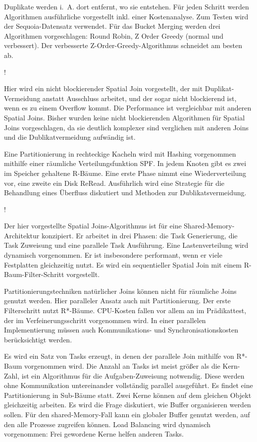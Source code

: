 \documentclass[a4paper,12pt,twoside]{article}
\begin{document}
	  Duplikate werden i.~A. dort entfernt, wo sie entstehen. Für jeden Schritt werden Algorithmen ausführliche vorgestellt inkl. einer Kostenanalyse. Zum Testen wird der Sequoia-Datensatz verwendet. Für das Bucket Merging  werden drei Algorithmen vorgeschlagen: Round Robin, Z Order Greedy (normal und verbessert). Der verbesserte Z-Order-Greedy-Algorithmus schneidet am besten ab. 

\textbf{}!

Hier wird ein nicht blockierender Spatial Join vorgestellt, der mit Duplikat-Vermeidung anstatt Ausschluss arbeitet, und der sogar nicht blockierend ist, wenn es zu einem Overflow kommt. Die Performance ist vergleichbar mit anderen Spatial Joins. Bisher wurden keine nicht blockierenden Algorithmen für Spatial Joins vorgeschlagen, da sie deutlich komplexer sind verglichen mit anderen Joins und die Dublikatvermeidung aufwändig ist.

Eine Partitionierung in rechteckige Kacheln wird mit Hashing vorgenommen mithilfe einer räumliche Verteilungsfunktion SPF. In jedem Knoten gibt es zwei im Speicher gehaltene R-Bäume. Eine erste Phase nimmt eine Wiederverteilung vor, eine zweite ein Disk ReRead. Ausführlich wird eine Strategie für die Behandlung eines Überfluss diskutiert und Methoden zur Dublikatsvermeidung. 

\textbf{}!

Der hier vorgestellte Spatial Joins-Algorithmus ist für eine Shared-Memory-Architektur konzipiert. Er arbeitet in drei Phasen: die Task Generierung, die Task Zuweisung und eine parallele Task Ausführung. Eine Lastenverteilung wird dynamisch vorgenommen. Er ist insbesondere performant, wenn er viele Festplatten gleichzeitig nutzt. Es wird ein sequentieller Spatial Join mit einem R-Baum-Filter-Schritt vorgestellt.

Partitionierungstechniken natürlicher Joins können nicht für räumliche Joins genutzt werden. Hier paralleler Ansatz auch mit Partitionierung. Der erste Filterschritt nutzt R*-Bäume. CPU-Kosten fallen vor allem an im Prädikattest, der im Verfeinerungsschritt vorgenommen wird. In einer parallelen Implementierung müssen auch Kommunikations- und Synchronisationskosten berücksichtigt werden. 

Es wird ein Satz von Tasks erzeugt, in denen der parallele Join mithilfe von R*-Baum vorgenommen wird. Die Anzahl an Tasks ist meist größer als die Kern-Zahl, ist ein Algorithmus für die Aufgaben-Zuweisung notwendig. Diese werden ohne Kommunikation untereinander vollständig parallel ausgeführt. Es findet eine Partitionierung in Sub-Bäume statt. Zwei Kerne können auf dem gleichen Objekt gleichzeitig arbeiten. Es wird die Frage diskutiert, wie Buffer organisieren werden sollen. Für den shared-Memory-Fall kann ein globaler Buffer genutzt werden, auf den alle Prozesse zugreifen können. Load Balancing wird dynamisch vorgenommen: Frei gewordene Kerne helfen anderen Tasks.
\end{document}
